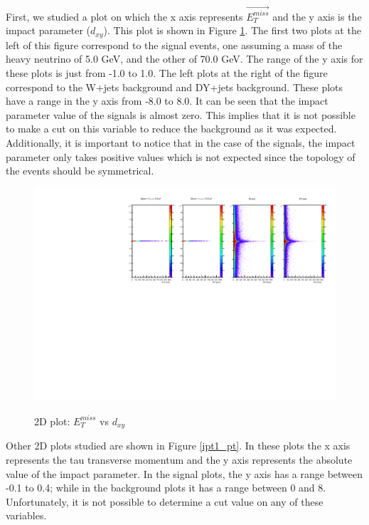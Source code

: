 First, we studied a plot on which the x axis 
represents $\vec{E_T^{miss}}$ and the y axis is the impact parameter ($d_{xy}$). This plot is shown in Figure \ref{ipt1_MET}. The first two plots at the left of this figure correspond to the signal events, one assuming a mass of the heavy neutrino of 5.0 GeV, and the other of 70.0 GeV. The range of the y axis for these plots is just from -1.0 to 1.0. The left plots at the right of the figure correspond to the W+jets background and DY+jets background. These plots have a range in the y axis from -8.0 to 8.0. It can be seen that the impact parameter value of the signals is almost zero. This implies that it is not possible to make a cut on this variable to reduce the background as it was expected. Additionally, it is important to notice that in the case of the signals, the impact parameter only takes positive values which is not expected since the topology of the events should be symmetrical. 
 
 \begin{figure}[h] 
 \centering
 \caption{2D plot: $E_T^{miss}$ vs $d_{xy}$}
 \includegraphics[width=1.15\textwidth]{./Capitulos/Analysis/c1} 
 \label{ipt1_MET}
 \end{figure}
 
Other 2D plots studied are shown in Figure \ref{ipt1_pt}. In these plots the x axis represents the tau transverse momentum and the y axis represents the absolute value of the impact parameter. In the signal plots, the y axis has a range between -0.1 to 0.4; while in the background plots it has a range between 0 and 8. Unfortunately, it is not possible to determine a cut value on any of these variables.
 

